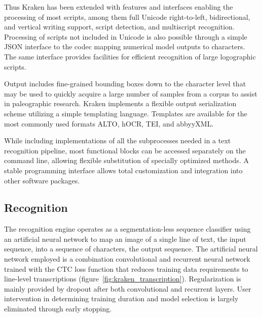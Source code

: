 Thus Kraken has been extended with features and interfaces enabling the
processing of most scripts, among them full Unicode right-to-left,
bidirectional, and vertical writing support, script detection, and multiscript
recognition. Processing of scripts not included in Unicode is also possible
through a simple JSON interface to the codec mapping numerical model outputs to
characters. The same interface provides facilities for efficient recognition of
large logographic scripts.

Output includes fine-grained bounding boxes down to the character level that
may be used to quickly acquire a large number of samples from a corpus to
assist in paleographic research. Kraken implements a flexible output
serialization scheme utilizing a simple templating language. Templates are
available for the most commonly used formats ALTO, hOCR, TEI, and abbyyXML.


While including implementations of all the subprocesses needed in a text
recognition pipeline, most functional blocks can be accessed separately on the
command line, allowing flexible substitution of specially optimized methods.  A
stable programming interface allows total customization and integration into
other software packages.

\subsection{Recognition}

The recognition engine operates as a segmentation-less sequence classifier
using an artificial neural network to map an image of a single line of text,
the input sequence, into a sequence of characters, the output sequence. The
artificial neural network employed is a combination convolutional and recurrent
neural network trained with the CTC loss function
\cite{graves2006connectionist} that reduces training data requirements to
line-level transcriptions (figure~\ref{fig:kraken_transcription}). Regularization is
mainly provided by dropout \cite{hinton2012improving} after both convolutional
and recurrent layers. User intervention in determining training duration and
model selection is largely eliminated through early stopping.

